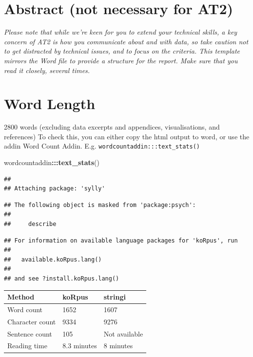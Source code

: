 \documentclass[]{article}
\newenvironment{Shaded}{\begin{snugshade}}{\end{snugshade}}
\newcommand{\KeywordTok}[1]{\textcolor[rgb]{0.13,0.29,0.53}{\textbf{#1}}}
\newcommand{\NormalTok}[1]{#1}
\newcommand{\OperatorTok}[1]{\textcolor[rgb]{0.81,0.36,0.00}{\textbf{#1}}}
\begin{document}
\hypertarget{abstract-not-necessary-for-at2}{%
\section{Abstract (not necessary for
AT2)}\label{abstract-not-necessary-for-at2}}

\emph{Please note that while we're keen for you to extend your technical
skills, \emph{a key concern of AT2 is how you communicate about and with
data}, so \emph{take caution not to get distracted by technical issues,
and to focus on the criteria}. This template mirrors the Word file to
provide a structure for the report. Make sure that you read it closely,
several times.}

\hypertarget{word-length}{%
\section{Word Length}\label{word-length}}

2800 words (excluding data excerpts and appendices, visualisations, and
references) To check this, you can either copy the html output to word,
or use the addin Word Count Addin. E.g.
\texttt{wordcountaddin:::text\_stats()}

\begin{Shaded}
\begin{Highlighting}[]
\NormalTok{wordcountaddin}\OperatorTok{:::}\KeywordTok{text_stats}\NormalTok{()}
\end{Highlighting}
\end{Shaded}

\begin{verbatim}
## 
## Attaching package: 'sylly'
\end{verbatim}

\begin{verbatim}
## The following object is masked from 'package:psych':
## 
##     describe
\end{verbatim}

\begin{verbatim}
## For information on available language packages for 'koRpus', run
## 
##   available.koRpus.lang()
## 
## and see ?install.koRpus.lang()
\end{verbatim}

\begin{longtable}[]{@{}lll@{}}
\toprule
Method & koRpus & stringi\tabularnewline
\midrule
\endhead
Word count & 1652 & 1607\tabularnewline
Character count & 9334 & 9276\tabularnewline
Sentence count & 105 & Not available\tabularnewline
Reading time & 8.3 minutes & 8 minutes\tabularnewline
\bottomrule
\end{longtable}
\end{document}
